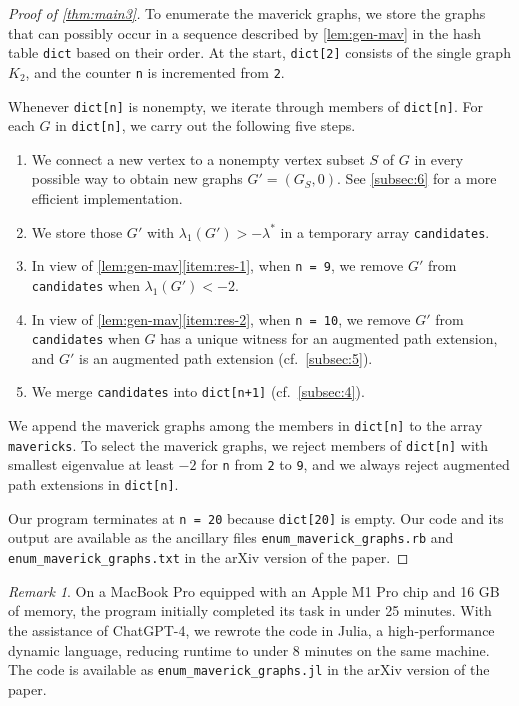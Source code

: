 \documentclass[11pt]{article}
\theoremstyle{definition}
\theoremstyle{remark}
\newtheorem*{remark}{Remark}
\newcommand{\computer}{\tikz[scale=0.28, baseline=0.1ex, transform shape]{\draw[rounded corners=0.02] (0.15, 0.45) rectangle (0.85, 0.85) {};\draw[rounded corners=0.02] (0, 0.3) rectangle (1, 1) {};\draw[rounded corners=0.02] (0, 0) rectangle (1, 0.2) {};\draw (0.2,0.1) -- (0.3,0.1);\draw (0.5,0.1) -- (0.8,0.1);}}
\newenvironment{cproof}[1][Proof]{\begin{proof}[#1]\renewcommand*{\qedsymbol}{\(\computer\)}}{\end{proof}}
\newcommand{\la}{\lambda}
\newcommand{\las}{\lambda^*}
\begin{document}
\begin{cproof}[Proof of \cref{thm:main3}]
    To enumerate the maverick graphs, we store the graphs that can possibly occur in a sequence described by \cref{lem:gen-mav} in the hash table \texttt{dict} based on their order. At the start, \texttt{dict[2]} consists of the single graph $K_2$, and the counter \texttt{n} is incremented from \texttt{2}.
    
    Whenever \texttt{dict[n]} is nonempty, we iterate through members of \texttt{dict[n]}. For each $G$ in \texttt{dict[n]}, we carry out the following five steps.

    \begin{enumerate}[label=(\roman*)]
        \item We connect a new vertex to a nonempty vertex subset $S$ of $G$ in every possible way to obtain new graphs $G' = (G_S, 0)$. See \cref{subsec:6} for a more efficient implementation.
        \item We store those $G'$ with $\la_1(G') > -\las$ in a temporary array \texttt{candidates}.
        \item In view of \cref{lem:gen-mav}\ref{item:res-1}, when \texttt{n = 9}, we remove $G'$ from \texttt{candidates} when $\la_1(G') < -2$.
        \item In view of \cref{lem:gen-mav}\ref{item:res-2}, when \texttt{n = 10}, we remove $G'$ from \texttt{candidates} when $G$ has a unique witness for an augmented path extension, and $G'$ is an augmented path extension (cf.\ \cref{subsec:5}).
        \item We merge \texttt{candidates} into \texttt{dict[n+1]} (cf.\ \cref{subsec:4}).
    \end{enumerate}

    We append the maverick graphs among the members in \texttt{dict[n]} to the array \texttt{mavericks}. To select the maverick graphs, we reject members of \texttt{dict[n]} with smallest eigenvalue at least $-2$ for \texttt{n} from \texttt{2} to \texttt{9}, and we always reject augmented path extensions in \texttt{dict[n]}.

    Our program terminates at \texttt{n = 20} because \texttt{dict[20]} is empty. Our code and its output are available as the ancillary files \texttt{enum\_maverick\_graphs.rb} and \texttt{enum\_maverick\_graphs.txt} in the arXiv version of the paper.
\end{cproof}

\begin{remark}
    On a MacBook Pro equipped with an Apple M1 Pro chip and 16 GB of memory, the program initially completed its task in under 25 minutes. With the assistance of ChatGPT-4, we rewrote the code in Julia, a high-performance dynamic language, reducing runtime to under 8 minutes on the same machine. The code is available as \texttt{enum\_maverick\_graphs.jl} in the arXiv version of the paper.
\end{remark}
\end{document}
